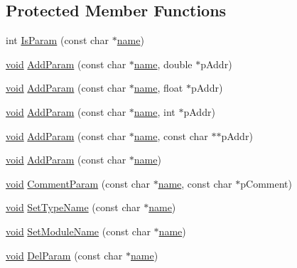 \subsection*{Protected Member Functions}
\begin{DoxyCompactItemize}
\item 
int \hyperlink{classCvVSModule_a9c64a77cbd94425554b378af23124714}{Is\-Param} (const char $\ast$\hyperlink{core__c_8h_add928d8eb85ea33a25a67db3406d4887}{name})
\item 
\hyperlink{legacy_8hpp_a8bb47f092d473522721002c86c13b94e}{void} \hyperlink{classCvVSModule_a7df55f7cb3e1c7019da879549d02e77b}{Add\-Param} (const char $\ast$\hyperlink{core__c_8h_add928d8eb85ea33a25a67db3406d4887}{name}, double $\ast$p\-Addr)
\item 
\hyperlink{legacy_8hpp_a8bb47f092d473522721002c86c13b94e}{void} \hyperlink{classCvVSModule_a611eabcbd6cbd5c7d726fb7b8222cba9}{Add\-Param} (const char $\ast$\hyperlink{core__c_8h_add928d8eb85ea33a25a67db3406d4887}{name}, float $\ast$p\-Addr)
\item 
\hyperlink{legacy_8hpp_a8bb47f092d473522721002c86c13b94e}{void} \hyperlink{classCvVSModule_ac54ec3ecbfd4e73a89ff7770bfe10d37}{Add\-Param} (const char $\ast$\hyperlink{core__c_8h_add928d8eb85ea33a25a67db3406d4887}{name}, int $\ast$p\-Addr)
\item 
\hyperlink{legacy_8hpp_a8bb47f092d473522721002c86c13b94e}{void} \hyperlink{classCvVSModule_aaf14a1b94407d41877b2b75dfd7c6960}{Add\-Param} (const char $\ast$\hyperlink{core__c_8h_add928d8eb85ea33a25a67db3406d4887}{name}, const char $\ast$$\ast$p\-Addr)
\item 
\hyperlink{legacy_8hpp_a8bb47f092d473522721002c86c13b94e}{void} \hyperlink{classCvVSModule_a5a29f3e6883f0e2641843e521c64dbdd}{Add\-Param} (const char $\ast$\hyperlink{core__c_8h_add928d8eb85ea33a25a67db3406d4887}{name})
\item 
\hyperlink{legacy_8hpp_a8bb47f092d473522721002c86c13b94e}{void} \hyperlink{classCvVSModule_a8c43f6b8a0ba700bbe161ad65dc509af}{Comment\-Param} (const char $\ast$\hyperlink{core__c_8h_add928d8eb85ea33a25a67db3406d4887}{name}, const char $\ast$p\-Comment)
\item 
\hyperlink{legacy_8hpp_a8bb47f092d473522721002c86c13b94e}{void} \hyperlink{classCvVSModule_aab1496a6cc6f3c46a9c617acd54db5e2}{Set\-Type\-Name} (const char $\ast$\hyperlink{core__c_8h_add928d8eb85ea33a25a67db3406d4887}{name})
\item 
\hyperlink{legacy_8hpp_a8bb47f092d473522721002c86c13b94e}{void} \hyperlink{classCvVSModule_aef3ad6bfa0f1e35c2c643c1372c19af3}{Set\-Module\-Name} (const char $\ast$\hyperlink{core__c_8h_add928d8eb85ea33a25a67db3406d4887}{name})
\item 
\hyperlink{legacy_8hpp_a8bb47f092d473522721002c86c13b94e}{void} \hyperlink{classCvVSModule_a07f7ad89ec605ed0fd5aec7f7527e7da}{Del\-Param} (const char $\ast$\hyperlink{core__c_8h_add928d8eb85ea33a25a67db3406d4887}{name})
\end{DoxyCompactItemize}
